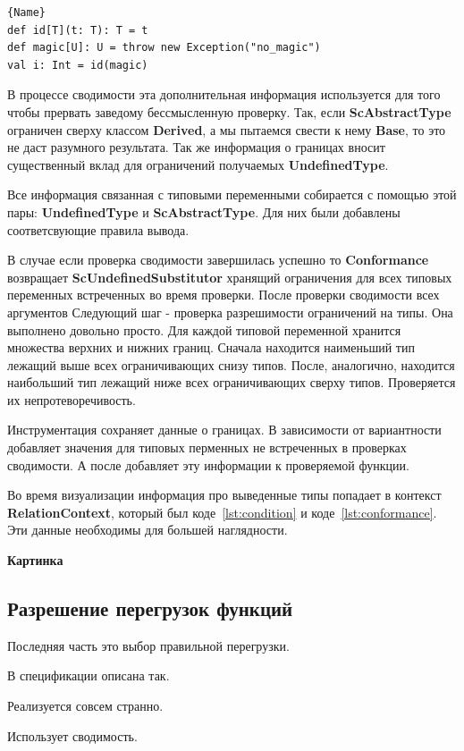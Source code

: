 \begin{lstlisting}[caption={Пример ScAbstractType},label=lst:abstract]{Name}
def id[T](t: T): T = t
def magic[U]: U = throw new Exception("no_magic")
val i: Int = id(magic)
\end{lstlisting}

В процессе сводимости эта дополнительная информация используется для
того чтобы прервать заведому бессмысленную проверку.
Так, если \textbf{ScAbstractType} ограничен сверху классом \textbf{Derived},
а мы пытаемся свести к нему \textbf{Base}, то это не даст разумного результата.
Так же информация о границах вносит существенный вклад для ограничений
получаемых \textbf{UndefinedType}.

Все информация связанная с типовыми переменными собирается с помощью этой пары:
\textbf{UndefinedType} и \textbf{ScAbstractType}.
Для них были добавлены соответсвующие правила вывода.

В случае если проверка сводимости завершилась успешно то \textbf{Conformance}
возвращает \textbf{ScUndefinedSubstitutor} хранящий ограничения для всех типовых
переменных встреченных во время проверки.
После проверки сводимости всех аргументов
Следующий шаг - проверка разрешимости ограничений на типы.
Она выполнено довольно просто.
Для каждой типовой переменной хранится множества верхних и нижних границ.
Сначала находится наименьший тип лежащий выше всех ограничивающих снизу типов.
После, аналогично, находится наибольший тип лежащий ниже всех ограничивающих
сверху типов.
Проверяется их непротеворечивость.

Инструментация сохраняет данные о границах.
В зависимости от вариантности добавляет значения для типовых перменных не
встреченных в проверках сводимости.
А после добавляет эту информации к проверяемой функции.

Во время визуализации информация про выведенные типы попадает в контекст
\textbf{RelationContext}, который был коде~\ref{lst:condition} и
коде~\ref{lst:conformance}.
Эти данные необходимы для большей наглядности.

\textbf{Картинка}

\subsection{Разрешение перегрузок функций}
\label{sec:overloading}

Последняя часть это выбор правильной перегрузки.

В спецификации описана так.

Реализуется совсем странно.

Использует сводимость.
